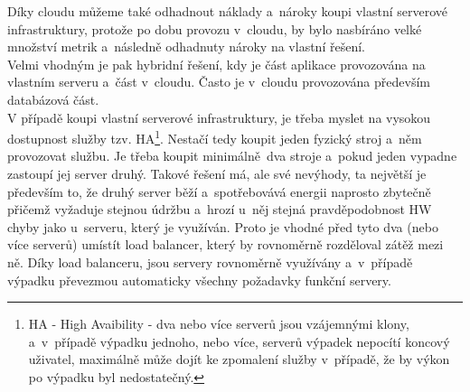 \documentclass[a4paper,12pt,twoside,BCOR=10mm]{article}
\begin{document}
Díky cloudu můžeme také odhadnout náklady a~nároky koupi vlastní serverové infrastruktury, protože po dobu provozu v~cloudu, by bylo nasbíráno velké množství metrik a~následně odhadnuty nároky na vlastní řešení.\\

Velmi vhodným je pak hybridní řešení, kdy je část aplikace provozována na vlastním serveru a~část v~cloudu. Často je v~cloudu provozována především databázová část. \\

V případě koupi vlastní serverové infrastruktury, je třeba myslet na vysokou dostupnost služby tzv. HA\footnote{HA - High Avaibility - dva nebo více serverů jsou vzájemnými klony, a~v~případě výpadku jednoho, nebo více, serverů výpadek nepocítí koncový uživatel, maximálně může dojít ke zpomalení služby v~případě, že by výkon po výpadku byl nedostatečný.}. Nestačí tedy koupit jeden fyzický stroj a~něm provozovat službu. Je třeba koupit minimálně dva stroje a~pokud jeden vypadne zastoupí jej server druhý. Takové řešení má, ale své nevýhody, ta největší je především to, že druhý server běží a~spotřebovává energii naprosto zbytečně přičemž vyžaduje stejnou údržbu a~hrozí u~něj stejná pravděpodobnost HW chyby jako u~serveru, který je využíván. Proto je vhodné před tyto dva (nebo více serverů) umístít load balancer, který by rovnoměrně rozděloval zátěž mezi ně. Díky load balanceru, jsou servery rovnoměrně využívány a~v~případě výpadku převezmou automaticky všechny požadavky funkční servery.\\
\end{document}
